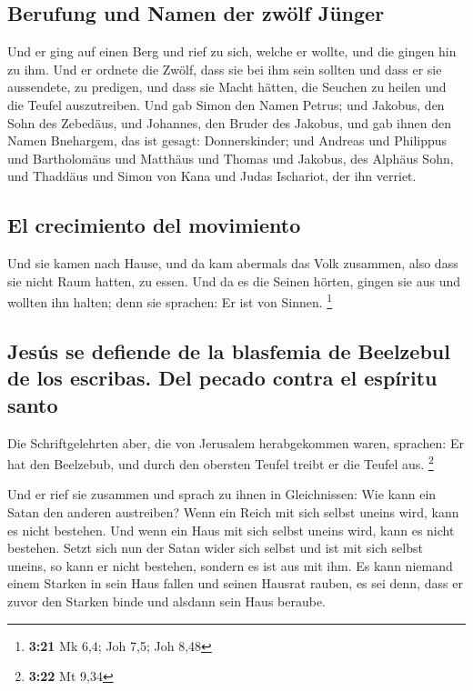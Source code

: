 \hypertarget{berufung-und-namen-der-zwuxf6lf-juxfcnger}{%
\subsection{Berufung und Namen der zwölf
Jünger}\label{berufung-und-namen-der-zwuxf6lf-juxfcnger}}

 Und er ging auf einen Berg und rief zu sich, welche er
wollte, und die gingen hin zu ihm.  Und er ordnete die
Zwölf, dass sie bei ihm sein sollten und dass er sie aussendete, zu
predigen,  und dass sie Macht hätten, die Seuchen zu
heilen und die Teufel auszutreiben.  Und gab Simon den
Namen Petrus;  und Jakobus, den Sohn des Zebedäus, und
Johannes, den Bruder des Jakobus, und gab ihnen den Namen Bnehargem, das
ist gesagt: Donnerskinder;  und Andreas und Philippus und
Bartholomäus und Matthäus und Thomas und Jakobus, des Alphäus Sohn, und
Thaddäus und Simon von Kana  und Judas Ischariot, der ihn
verriet.

\hypertarget{el-crecimiento-del-movimiento}{%
\subsection{El crecimiento del
movimiento}\label{el-crecimiento-del-movimiento}}

 Und sie kamen nach Hause, und da kam abermals das Volk
zusammen, also dass sie nicht Raum hatten, zu essen.  Und
da es die Seinen hörten, gingen sie aus und wollten ihn halten; denn sie
sprachen: Er ist von Sinnen. \footnote{\textbf{3:21} Mk 6,4; Joh 7,5;
  Joh 8,48}

\hypertarget{jesuxfas-se-defiende-de-la-blasfemia-de-beelzebul-de-los-escribas.-del-pecado-contra-el-espuxedritu-santo}{%
\subsection{Jesús se defiende de la blasfemia de Beelzebul de los
escribas. Del pecado contra el espíritu
santo}\label{jesuxfas-se-defiende-de-la-blasfemia-de-beelzebul-de-los-escribas.-del-pecado-contra-el-espuxedritu-santo}}

 Die Schriftgelehrten aber, die von Jerusalem
herabgekommen waren, sprachen: Er hat den Beelzebub, und durch den
obersten Teufel treibt er die Teufel aus. \footnote{\textbf{3:22} Mt
  9,34}

 Und er rief sie zusammen und sprach zu ihnen in
Gleichnissen: Wie kann ein Satan den anderen austreiben? 
Wenn ein Reich mit sich selbst uneins wird, kann es nicht bestehen.
 Und wenn ein Haus mit sich selbst uneins wird, kann es
nicht bestehen.  Setzt sich nun der Satan wider sich
selbst und ist mit sich selbst uneins, so kann er nicht bestehen,
sondern es ist aus mit ihm.  Es kann niemand einem
Starken in sein Haus fallen und seinen Hausrat rauben, es sei denn, dass
er zuvor den Starken binde und alsdann sein Haus beraube.

